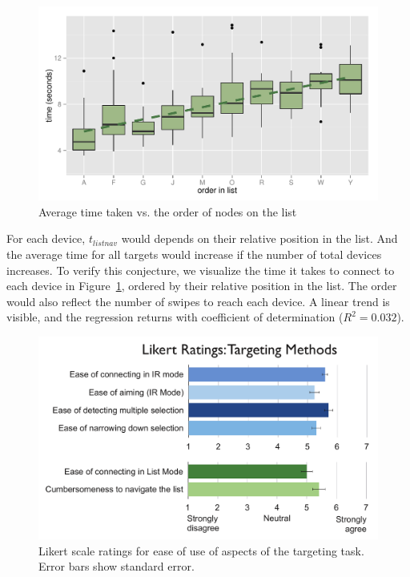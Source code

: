\begin{figure}[t]
\centering
\includegraphics[width=1.0\columnwidth]{figures/R_List_by_Target.pdf}
\caption{Average time taken vs. the order of nodes on the list  } 
\label{fig:time-vs-list-order}
\end{figure}

For each device, $t_{listnav}$ would depends on their relative position in the list. And the average time for all targets would increase if the number of total devices increases. To verify this conjecture, we visualize the time it takes to connect to each device in Figure~\ref{fig:time-vs-list-order}, ordered by their relative position in the list. The order would also reflect the number of swipes to reach each device. A linear trend is visible, and the regression returns with coefficient of determination ($R^2=0.032$).

\begin{figure}[t]
\centering
\includegraphics[width=1.0\columnwidth]{figures/target-likert.pdf}
\caption{Likert scale ratings for ease of use of aspects of the targeting task. Error bars show standard error. }
\label{fig:target-likert}
\end{figure}

